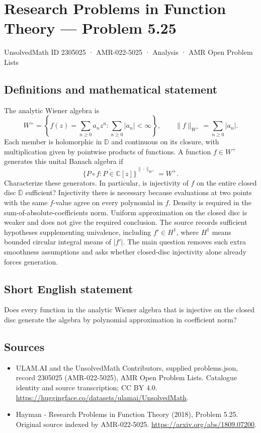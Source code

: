 \documentclass[11pt,a4paper]{article}
\begin{document}
\section*{Research Problems in Function Theory — Problem 5.25}\label{2305025}
{\small UnsolvedMath ID 2305025 · AMR-022-5025 · Analysis · AMR Open Problem Lists}
\subsection{Definitions and mathematical statement}
The analytic Wiener algebra is
\[
W^+=\left\{f(z)=\sum_{n\ge0}a_nz^n:\sum_{n\ge0}|a_n|<\infty\right\},
\qquad\|f\|_{W^+}=\sum_{n\ge0}|a_n|.
\]
Each member is holomorphic in $\mathbb D$ and continuous on its closure, with multiplication given by pointwise products of functions. A function $f\in W^+$ generates this unital Banach algebra if
\[
\overline{\{P\circ f:P\in\mathbb C[z]\}}^{\|\cdot\|_{W^+}}=W^+.
\]
Characterize these generators. In particular, is injectivity of $f$ on the entire closed disc $\overline{\mathbb D}$ sufficient? Injectivity there is necessary because evaluations at two points with the same $f$-value agree on every polynomial in $f$.
Density is required in the sum-of-absolute-coefficients norm. Uniform approximation on the closed disc is weaker and does not give the required conclusion. The source records sufficient hypotheses supplementing univalence, including $f'\in H^1$, where $H^1$ means bounded circular integral means of $|f'|$. The main question removes such extra smoothness assumptions and asks whether closed-disc injectivity alone already forces generation.
\subsection{Short English statement}
Does every function in the analytic Wiener algebra that is injective on the closed disc generate the algebra by polynomial approximation in coefficient norm?
\subsection{Sources}
\begin{itemize}
\item[S1] ULAM.AI and the UnsolvedMath Contributors, supplied problems.json, record 2305025 (AMR-022-5025), AMR Open Problem Lists. Catalogue identity and source transcription; CC BY 4.0.
\url{https://huggingface.co/datasets/ulamai/UnsolvedMath}.
\item[S2] Hayman - Research Problems in Function Theory (2018), Problem 5.25. Original source indexed by AMR-022-5025.
\url{https://arxiv.org/abs/1809.07200}.
\end{itemize}
\end{document}

